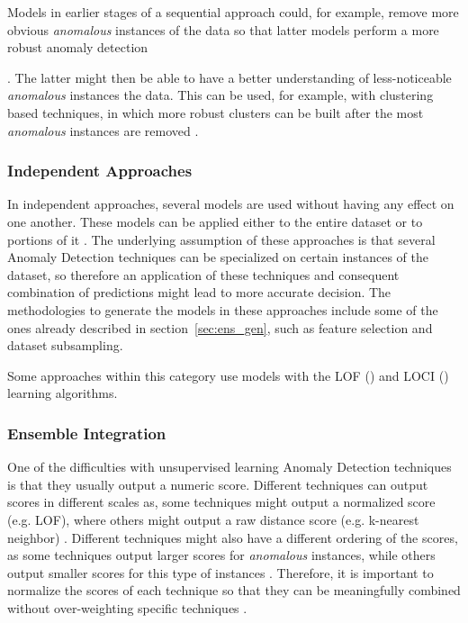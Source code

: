 Models in earlier stages of a sequential approach could, for example, remove more obvious \textit{anomalous} instances of the data so that latter models perform a more robust anomaly detection {\cite{Aggarwal:2013:OA:2436823}.
The latter might then be able to have a better understanding of less-noticeable \textit{anomalous} instances the data.
This can be used, for example, with clustering based techniques, in which more robust clusters can be built after the most \textit{anomalous} instances are removed \cite{Barbara:2003:BDM:952532.952616}.

\subsubsection{Independent Approaches}

In independent approaches, several models are used without having any effect on one another.
These models can be applied either to the entire dataset or to portions of it \cite{Aggarwal:2013:OA:2436823}.
The underlying assumption of these approaches is that several Anomaly Detection techniques can be specialized on certain instances of the dataset, so therefore an application of these techniques and consequent combination of predictions might lead to more accurate decision.
The methodologies to generate the models in these approaches include some of the ones already described in section~\ref{sec:ens_gen}, such as feature selection and dataset subsampling.

Some approaches within this category use models with the LOF (\cite{Breunig:2000:LID:335191.335388}) and LOCI (\cite{PapadimitriouS.KitagawaH.2003}) learning algorithms.	

\subsubsection{Ensemble Integration}

One of the difficulties with unsupervised learning Anomaly Detection techniques is that they usually output a numeric score.
Different techniques can output scores in different scales as, some techniques might output a normalized score (e.g. LOF), where others might output a raw distance score (e.g. k-nearest neighbor) \cite{Aggarwal:2013:OA:2436823}.
Different techniques might also have a different ordering of the scores, as some techniques output larger scores for \textit{anomalous} instances, while others output smaller scores for this type of instances \cite{Aggarwal:2013:OA:2436823}.
Therefore, it is important to normalize the scores of each technique so that they can be meaningfully combined without over-weighting specific techniques \cite{Aggarwal:2013:OA:2436823}.

}
